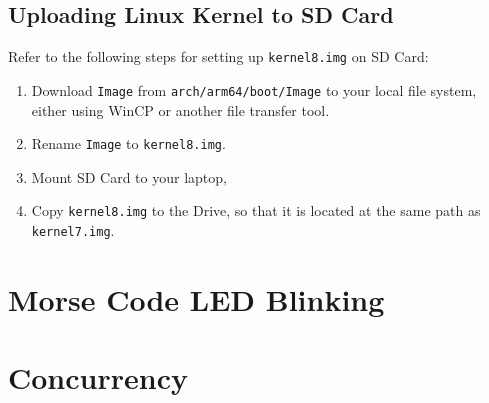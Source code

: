 \documentclass[onecolumn, draftclsnofoot, 10pt, compsoc]{IEEEtran}
\begin{document}
\subsection{Uploading Linux Kernel to SD Card}
Refer to the following steps for setting up \texttt{kernel8.img} on SD Card:
\begin{enumerate}
\item Download \texttt{Image} from \texttt{arch/arm64/boot/Image} to your local file system, either using WinCP or another file transfer tool.
\item Rename \texttt{Image} to \texttt{kernel8.img}.
\item Mount SD Card to your laptop,
\item Copy \texttt{kernel8.img} to the Drive, so that it is located at the same path as \texttt{kernel7.img}.
\end{enumerate}



\section{Morse Code LED Blinking}



\section{Concurrency}


\clearpage
\medskip


\end{document}
